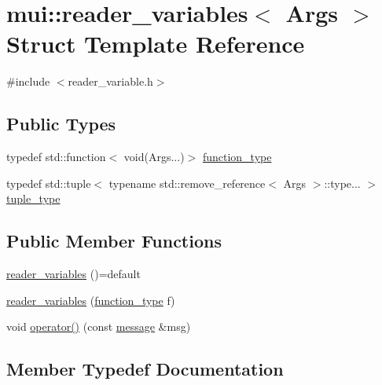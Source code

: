 \hypertarget{structmui_1_1reader__variables}{}\section{mui\+:\+:reader\+\_\+variables$<$ Args $>$ Struct Template Reference}
\label{structmui_1_1reader__variables}


{\ttfamily \#include $<$reader\+\_\+variable.\+h$>$}

\subsection*{Public Types}
\begin{DoxyCompactItemize}
\item 
typedef std\+::function$<$ void(Args...)$>$ \hyperlink{structmui_1_1reader__variables_a55fa3e6c55f9ce1a4f4031de4c9843e4}{function\+\_\+type}
\item 
typedef std\+::tuple$<$ typename std\+::remove\+\_\+reference$<$ Args $>$\+::type... $>$ \hyperlink{structmui_1_1reader__variables_a84bdea853e82725af84c870382869ee1}{tuple\+\_\+type}
\end{DoxyCompactItemize}
\subsection*{Public Member Functions}
\begin{DoxyCompactItemize}
\item 
\hyperlink{structmui_1_1reader__variables_ac91f32d1e2e6171eff8285c37082dbbd}{reader\+\_\+variables} ()=default
\item 
\hyperlink{structmui_1_1reader__variables_a60e48ba3313369ed2a3180a7826129f1}{reader\+\_\+variables} (\hyperlink{structmui_1_1reader__variables_a55fa3e6c55f9ce1a4f4031de4c9843e4}{function\+\_\+type} f)
\item 
void \hyperlink{structmui_1_1reader__variables_a622185f191581ff0c15b1ba5ff43ea59}{operator()} (const \hyperlink{structmui_1_1message}{message} \&msg)
\end{DoxyCompactItemize}


\subsection{Member Typedef Documentation}
\mbox{\label{structmui_1_1reader__variables_a55fa3e6c55f9ce1a4f4031de4c9843e4}} 
